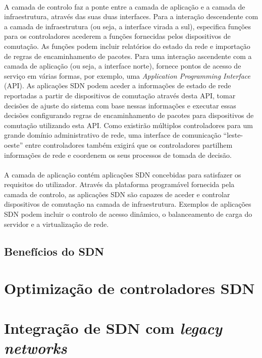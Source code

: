 \documentclass{llncs}
\begin{document}
\paragraph{}
A camada de controlo faz a ponte entre a camada de aplicação e a camada de infraestrutura, através das suas duas interfaces. Para a interação descendente com a camada de infraestrutura (ou seja, a interface virada a sul), especifica funções para os controladores acederem a funções fornecidas pelos dispositivos de comutação. As funções podem incluir relatórios do estado da rede e importação de regras de encaminhamento de pacotes. Para uma interação ascendente com a camada de aplicação (ou seja, a interface norte), fornece pontos de acesso de serviço em várias formas, por exemplo, uma \textit{Application Programming Interface} (API). As aplicações SDN podem aceder a informações de estado de rede reportadas a partir de dispositivos de comutação através desta API, tomar decisões de ajuste do sistema com base nessas informações e executar essas decisões configurando regras de encaminhamento de pacotes para dispositivos de comutação utilizando esta API. Como existirão múltiplos controladores para um grande domínio administrativo de rede, uma interface de comunicação “leste-oeste” entre controladores também exigirá que os controladores partilhem informações de rede e coordenem os seus processos de tomada de decisão.
\paragraph{}
A camada de aplicação contém aplicações SDN concebidas para satisfazer os requisitos do utilizador. Através da plataforma programável fornecida pela camada de controlo, as aplicações SDN são capazes de aceder e controlar dispositivos de comutação na camada de infraestrutura. Exemplos de aplicações SDN podem incluir o controlo de acesso dinâmico, o balanceamento de carga do servidor e a virtualização de rede.

\subsection{Benefícios do SDN}

\section{Optimização de controladores SDN}

\section{Integração de SDN com \textit{legacy networks}}
\end{document}
